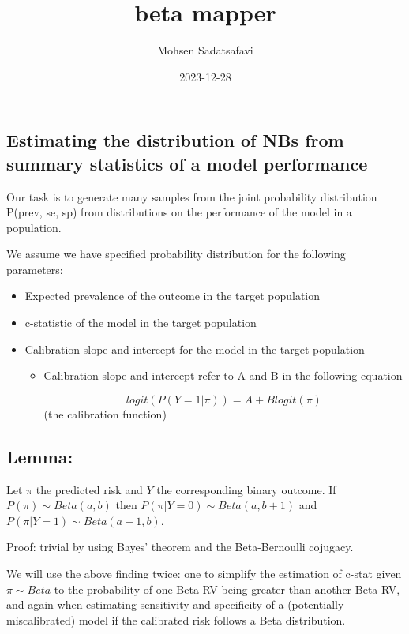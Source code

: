 \documentclass[
]{article}
\title{beta mapper}
\author{Mohsen Sadatsafavi}
\date{2023-12-28}
\begin{document}
\maketitle

\hypertarget{estimating-the-distribution-of-nbs-from-summary-statistics-of-a-model-performance}{%
\subsection{Estimating the distribution of NBs from summary statistics
of a model
performance}\label{estimating-the-distribution-of-nbs-from-summary-statistics-of-a-model-performance}}

Our task is to generate many samples from the joint probability
distribution P(prev, se, sp) from distributions on the performance of
the model in a population.

We assume we have specified probability distribution for the following
parameters:

\begin{itemize}
\item
  Expected prevalence of the outcome in the target population
\item
  c-statistic of the model in the target population
\item
  Calibration slope and intercept for the model in the target population

  \begin{itemize}
  \item
    Calibration slope and intercept refer to A and B in the following
    equation

    \[ logit(P(Y=1 | \pi))=A+Blogit(\pi) \] (the calibration function)
  \end{itemize}
\end{itemize}

\hypertarget{lemma}{%
\subsection{Lemma:}\label{lemma}}

Let \(\pi\) the predicted risk and \(Y\) the corresponding binary
outcome. If \(P(\pi) \sim Beta(a,b)\) then
\(P(\pi | Y=0)\sim Beta(a,b+1)\) and \(P(\pi | Y=1)\sim Beta(a+1,b)\).

Proof: trivial by using Bayes' theorem and the Beta-Bernoulli cojugacy.

We will use the above finding twice: one to simplify the estimation of
c-stat given \(\pi \sim Beta\) to the probability of one Beta RV being
greater than another Beta RV, and again when estimating sensitivity and
specificity of a (potentially miscalibrated) model if the calibrated
risk follows a Beta distribution.
\end{document}
